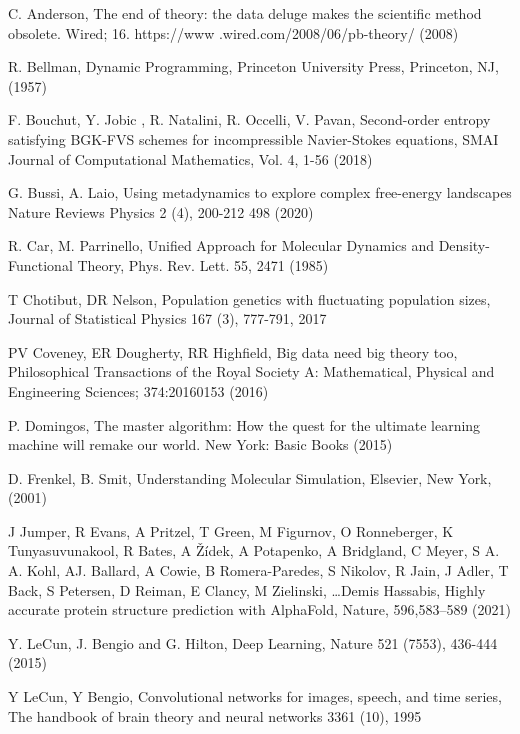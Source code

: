 \begin{thebibliography}{99}

 C. Anderson,
The end of theory: the data deluge makes the scientific method obsolete. 
Wired; 16. https://www .wired.com/2008/06/pb-theory/ (2008)

 R. Bellman,
Dynamic Programming, Princeton University Press, Princeton, NJ, (1957)

 F. Bouchut, Y. Jobic , R. Natalini, R. Occelli, V. Pavan,
Second-order entropy satisfying BGK-FVS schemes for
incompressible Navier-Stokes equations,
SMAI Journal of Computational Mathematics, Vol. 4, 1-56 (2018)

 G. Bussi, A. Laio,
Using metadynamics to explore complex free-energy landscapes
Nature Reviews Physics 2 (4), 200-212 498 (2020)

 R. Car, M. Parrinello,
Unified Approach for Molecular Dynamics and Density-Functional Theory,
Phys. Rev. Lett. 55, 2471 (1985)

 T Chotibut, DR Nelson,
Population genetics with fluctuating population sizes,
Journal of Statistical Physics 167 (3), 777-791, 2017

 PV Coveney, ER Dougherty, RR Highfield, 
Big data need big theory too, 
Philosophical Transactions of the Royal Society A: 
Mathematical, Physical and Engineering Sciences; 374:20160153 (2016)

 P. Domingos,  
The master algorithm: How the quest for the ultimate learning machine 
will remake our world. New York: Basic Books (2015)

 D. Frenkel, B. Smit,
Understanding Molecular Simulation,
Elsevier, New York, (2001)

 J Jumper, R Evans, A Pritzel, T Green, M Figurnov, O Ronneberger, 
K Tunyasuvunakool, R Bates, A Žídek, A Potapenko, 
A Bridgland, C Meyer, S A. A. Kohl, AJ. Ballard, 
A Cowie, B Romera-Paredes, S Nikolov, R Jain, 
J Adler, T Back, S Petersen, D Reiman, 
E Clancy, M Zielinski, …Demis Hassabis,
Highly accurate protein structure prediction with AlphaFold,
Nature, 596,583–589 (2021)

 Y. LeCun, J. Bengio and G. Hilton,
Deep Learning, Nature 521 (7553), 436-444 (2015)

 Y LeCun, Y Bengio,
Convolutional networks for images, speech, and time series,
The handbook of brain theory and neural networks 3361 (10), 1995



\end{thebibliography}
